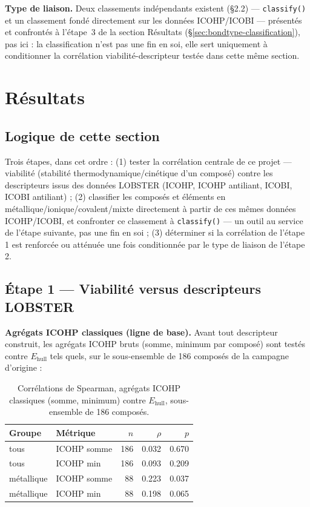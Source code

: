 \documentclass[11pt,a4paper]{article}
\begin{document}
\textbf{Type de liaison.} Deux classements indépendants existent (\S2.2) --- \texttt{classify()} et un classement fondé directement sur les données ICOHP/ICOBI --- présentés et confrontés à l'étape~3 de la section Résultats (\S\ref{sec:bondtype-classification}), pas ici : la classification n'est pas une fin en soi, elle sert uniquement à conditionner la corrélation viabilité-descripteur testée dans cette même section.

\section{Résultats}
\label{sec:results}

\subsection*{Logique de cette section}

Trois étapes, dans cet ordre : (1) tester la corrélation centrale de ce
projet --- viabilité (stabilité thermodynamique/cinétique d'un composé)
contre les descripteurs issus des données LOBSTER (ICOHP, ICOHP
antiliant, ICOBI, ICOBI antiliant) ; (2) classifier les composés et
éléments en métallique/ionique/covalent/mixte directement à partir de
ces mêmes données ICOHP/ICOBI, et confronter ce classement à
\texttt{classify()} --- un outil au service de l'étape suivante, pas une
fin en soi ; (3) déterminer si la corrélation de l'étape 1 est renforcée
ou atténuée une fois conditionnée par le type de liaison de l'étape 2.

\subsection{Étape 1 --- Viabilité versus descripteurs LOBSTER}
\label{sec:reframing}

\textbf{Agrégats ICOHP classiques (ligne de base).} Avant tout
descripteur construit, les agrégats ICOHP bruts (somme, minimum par
composé) sont testés contre $E_\text{hull}$ tels quels, sur le
sous-ensemble de 186 composés de la campagne d'origine :

\begin{table}[htbp]
\centering
\caption{Corrélations de Spearman, agrégats ICOHP classiques (somme, minimum) contre $E_\text{hull}$, sous-ensemble de 186 composés.}
\label{tab:classic-icohp}
\small
\begin{tabular}{@{}llrrr@{}}
\toprule
Groupe & Métrique & $n$ & $\rho$ & $p$ \\
\midrule
tous & ICOHP somme    & 186 & 0.032 & 0.670 \\
tous & ICOHP min      & 186 & 0.093 & 0.209 \\
métallique & ICOHP somme  & 88 & 0.223 & 0.037 \\
métallique & ICOHP min    & 88 & 0.198 & 0.065 \\
\bottomrule
\end{tabular}
\end{table}
\end{document}
